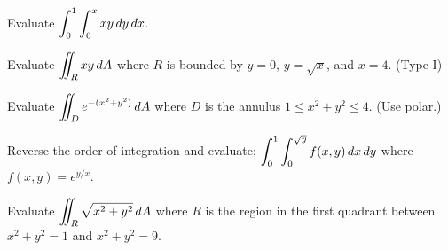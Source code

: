 \documentclass[11pt]{article}
\begin{document}

\begin{practice}

\prob Evaluate $\displaystyle\int_0^1\int_0^x xy\,dy\,dx$.


\vspace{3cm}

\prob Evaluate $\displaystyle\iint_R xy\,dA$ where $R$ is bounded by $y = 0$, $y = \sqrt{x}$, and $x = 4$. (Type I)


\vspace{4cm}

\prob Evaluate $\displaystyle\iint_D e^{-(x^2+y^2)}\,dA$ where $D$ is the annulus $1 \le x^2+y^2 \le 4$. (Use polar.)


\vspace{4cm}

\prob Reverse the order of integration and evaluate: $\displaystyle\int_0^1\int_0^{\sqrt{y}} f(x,y)\,dx\,dy$ where $f(x,y) = e^{y/x}$.


\vspace{4cm}

\prob Evaluate $\displaystyle\iint_R \sqrt{x^2+y^2}\,dA$ where $R$ is the region in the first quadrant between $x^2+y^2=1$ and $x^2+y^2=9$.


\vspace{4cm}

\end{practice}
\end{document}
